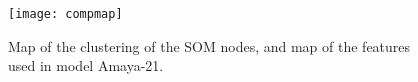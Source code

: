 \documentclass[utf8]{frontiersSCNS} %
\begin{document}
\begin{figure}[h!]\centering
	\texttt{[image: compmap]}
	\caption{Map of the clustering of the SOM nodes, and map of the features used in model Amaya-21.}\label{fig:compmap}
\end{figure}
\end{document}

